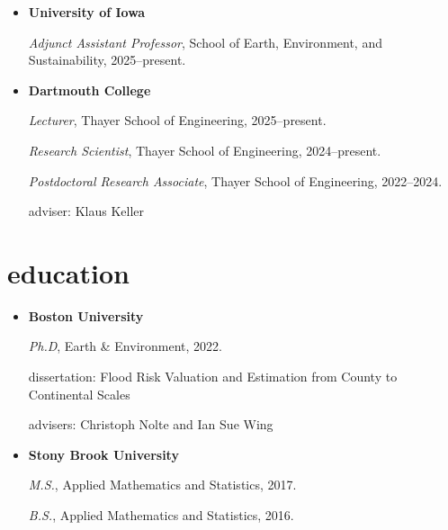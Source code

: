 \documentclass[10pt,oneside]{article}
\begin{document}
\mbox{}\vspace{-\dimexpr\baselineskip\relax}

\begin{itemize}[label={}]
  
  \item \textbf{University of Iowa}
        
        \textit{Adjunct Assistant Professor}, School of Earth, Environment, and Sustainability, 2025--present.
        
        
        
  \item \textbf{Dartmouth College}
        
        \textit{Lecturer}, Thayer School of Engineering, 2025--present.
        
        
        \textit{Research Scientist}, Thayer School of Engineering, 2024--present.
        
        
        \textit{Postdoctoral Research Associate}, Thayer School of Engineering, 2022--2024.
        
        adviser: Klaus Keller
        
        
        
\end{itemize}


\section{education}

\mbox{}\vspace{-\dimexpr\baselineskip\relax}

\begin{itemize}[label={}]
  
  \item \textbf{Boston University}
        
        \textit{Ph.D}, Earth \& Environment, 2022.
        
        
        dissertation: Flood Risk Valuation and Estimation from County to Continental Scales
        
        advisers: Christoph Nolte and Ian Sue Wing
        
        
  \item \textbf{Stony Brook University}
        
        \textit{M.S.}, Applied Mathematics and Statistics, 2017.
        
        \textit{B.S.}, Applied Mathematics and Statistics, 2016.
        
        
        
\end{itemize}
\end{document}
